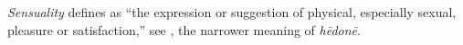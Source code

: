 \item[Sensuality,]

\emph{Sensuality} defines as ``the expression or suggestion of physical, especially sexual, pleasure or satisfaction,'' see , the narrower meaning of \emph{hēdonē}.
